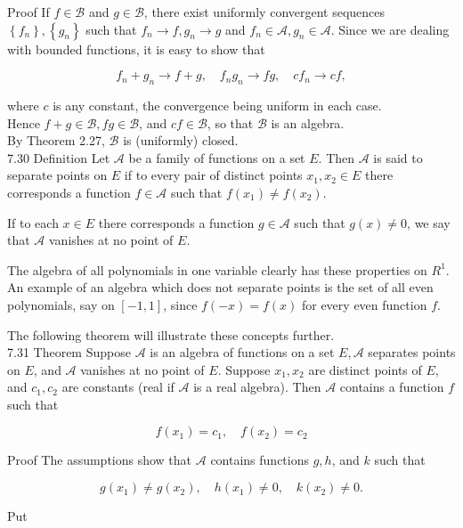 \documentclass[10pt]{article}
\begin{document}
Proof If $f \in \mathscr{B}$ and $g \in \mathscr{B}$, there exist uniformly convergent sequences $\left\{f_{n}\right\},\left\{g_{n}\right\}$ such that $f_{n} \rightarrow f, g_{n} \rightarrow g$ and $f_{n} \in \mathscr{A}, g_{n} \in \mathscr{A}$. Since we are dealing with bounded functions, it is easy to show that

$$
f_{n}+g_{n} \rightarrow f+g, \quad f_{n} g_{n} \rightarrow f g, \quad c f_{n} \rightarrow c f,
$$

where $c$ is any constant, the convergence being uniform in each case.\\
Hence $f+g \in \mathscr{B}, f g \in \mathscr{B}$, and $c f \in \mathscr{B}$, so that $\mathscr{B}$ is an algebra.\\
By Theorem 2.27, $\mathscr{B}$ is (uniformly) closed.\\
7.30 Definition Let $\mathscr{A}$ be a family of functions on a set $E$. Then $\mathscr{A}$ is said to separate points on $E$ if to every pair of distinct points $x_{1}, x_{2} \in E$ there corresponds a function $f \in \mathscr{A}$ such that $f\left(x_{1}\right) \neq f\left(x_{2}\right)$.

If to each $x \in E$ there corresponds a function $g \in \mathscr{A}$ such that $g(x) \neq 0$, we say that $\mathscr{A}$ vanishes at no point of $E$.

The algebra of all polynomials in one variable clearly has these properties on $R^{1}$. An example of an algebra which does not separate points is the set of all even polynomials, say on $[-1,1]$, since $f(-x)=f(x)$ for every even function $f$.

The following theorem will illustrate these concepts further.\\
7.31 Theorem Suppose $\mathscr{A}$ is an algebra of functions on a set $E, \mathscr{A}$ separates points on $E$, and $\mathscr{A}$ vanishes at no point of $E$. Suppose $x_{1}, x_{2}$ are distinct points of $E$, and $c_{1}, c_{2}$ are constants (real if $\mathscr{A}$ is a real algebra). Then $\mathscr{A}$ contains a function $f$ such that

$$
f\left(x_{1}\right)=c_{1}, \quad f\left(x_{2}\right)=c_{2}
$$

Proof The assumptions show that $\mathscr{A}$ contains functions $g, h$, and $k$ such that

$$
g\left(x_{1}\right) \neq g\left(x_{2}\right), \quad h\left(x_{1}\right) \neq 0, \quad k\left(x_{2}\right) \neq 0 .
$$

Put
\end{document}
